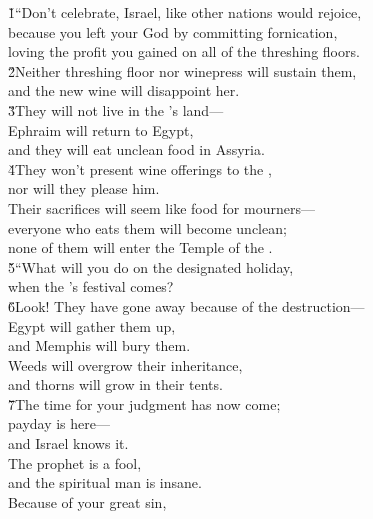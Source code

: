 \begin{poetry}
\poeml {}
\v{1}``Don't celebrate, Israel, like other nations would rejoice, \\
\poeml because you left your God by committing fornication, \\
\poemlll       loving the profit you gained on all of the threshing floors. \\
\poeml \v{2}Neither threshing floor nor winepress will sustain them, \\
\poemll    and the new wine will disappoint her. \\
\poeml \v{3}They will not live in the 's land--- \\
\poemll    Ephraim will return to Egypt, \\
\poemlll       and they will eat unclean food in Assyria. \\
\poeml \v{4}They won't present wine offerings to the , \\
\poemll    nor will they please him. \\
\poeml Their sacrifices will seem like food for mourners--- \\
\poemll    everyone who eats them will become unclean; \\
\poemlll       none of them will enter the Temple of the . \\
\poeml \v{5}``What will you do on the designated holiday, \\
\poemll    when the 's festival comes? \\
\poeml \v{6}Look! They have gone away because of the destruction--- \\
\poemll    Egypt will gather them up, \\
\poemlll       and Memphis will bury them. \\
\poeml Weeds will overgrow their inheritance, \\
\poemll    and thorns will grow in their tents. \\
\poeml \v{7}The time for your judgment has now come; \\
\poemll    payday is here--- \\
\poemlll       and Israel knows it. \\
\poeml The prophet is a fool, \\
\poemll    and the spiritual man is insane. \\
\poeml Because of your great sin, \\

\end{poetry}
